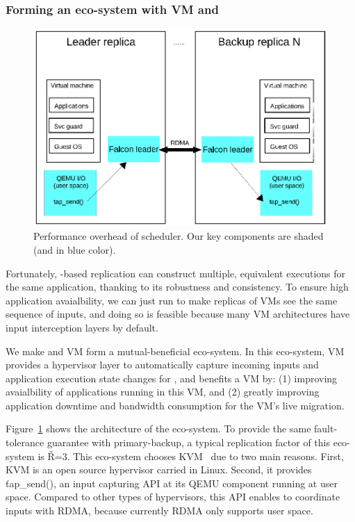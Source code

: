 \vspace{-.15in}\subsubsection{Forming an eco-system with VM and \falcon} 
\label{sec:vm-arch}\vspace{-.075in}

\begin{figure}[!htb]
\centering
\vspace{-.2in}
\includegraphics[width=0.34\textheight]{figures/vm_arch.ps}
        \vspace{-.3in}
        \caption{Performance overhead of scheduler. Our key components are 
shaded (and in blue color).}
        \label{fig:vm-arch}
\end{figure}

Fortunately, \paxos-based replication can construct multiple, equivalent 
executions for the same application, thanking to its robustness and 
consistency. To ensure high application avaialbility, we can just run \paxos to 
make replicas of VMs see the same sequence of inputs, and doing so is feasible 
because many VM architectures have input interception layers by default.

We make \falcon and VM form a mutual-beneficial eco-system. In this eco-system, 
VM provides a hypervisor layer to automatically capture incoming inputs and 
application execution state changes for \falcon, and \falcon benefits a VM by: 
(1) improving avaialbility of applications running in this VM, and (2) greatly 
improving application downtime and bandwidth consumption for the VM's live 
migration.

Figure~\ref{fig:vm-arch} shows the architecture of the eco-system. To provide 
the same fault-tolerance guarantee with primary-backup, a typical replication 
factor of this eco-system is \v{R=3}. This eco-system chooses KVM~\cite{kvm} 
due to two main reasons. First, KVM is an open source hypervisor carried in 
Linux. Second, it provides \v{tap\_send()}, an input capturing API at its QEMU 
component running at user space. Compared to other types of hypervisors, this 
API enables \falcon to coordinate inputs with RDMA, because currently RDMA only 
supports user space.

